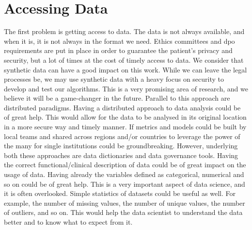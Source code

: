 \section{Accessing Data}
The first problem is getting access to data. The data is not always available, and when it is, it is not always in the format we need. Ethics committees and \ac{dpo} requirements are put in place in order to guarantee the patient's privacy and security, but a lot of times at the cost of timely access to data. We consider that synthetic data can have a good impact on this work. While we can leave the legal processes be, we may use synthetic data with a heavy focus on security to develop and test our algorithms. This is a very promising area of research, and we believe it will be a game-changer in the future.
Parallel to this approach are distributed paradigms. Having a distributed approach to data analysis could be of great help. This would allow for the data to be analysed in its original location in a more secure way and timely manner. If metrics and models could be built by local teams and shared across regions and/or countries to leverage the power of the many for single institutions could be groundbreaking. However, underlying both these approaches are data dictionaries and data governance tools. Having the correct functional/clinical description of data could be of great impact on the usage of data. Having already the variables defined as categorical, numerical and so on could be of great help. This is a very important aspect of data science, and it is often overlooked. Simple statistics of datasets could be useful as well. For example, the number of missing values, the number of unique values, the number of outliers, and so on. This would help the data scientist to understand the data better and to know what to expect from it. 

